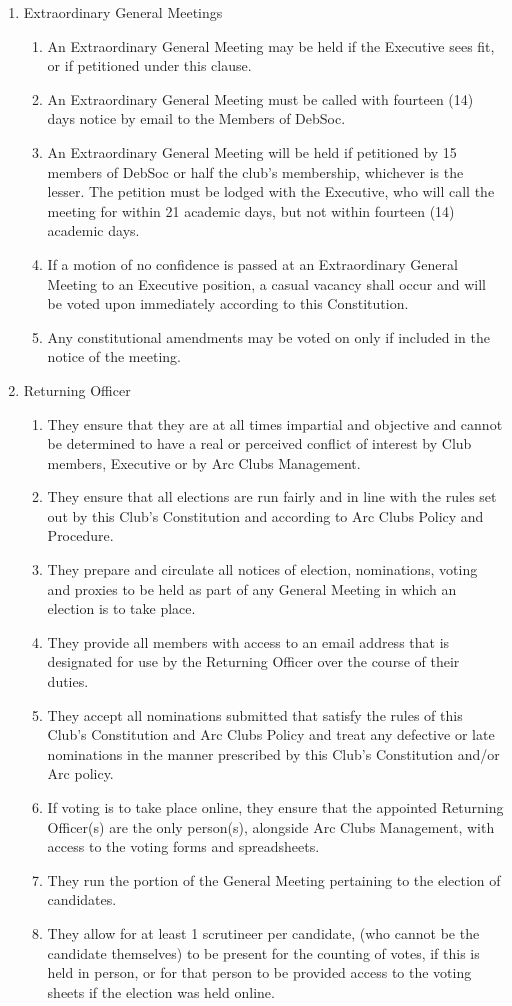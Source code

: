 \begin{enumerate}
\item Extraordinary General Meetings \label{egm_procedure}
  \begin{enumerate}
  \item An Extraordinary General Meeting may be held if the Executive sees fit, or if petitioned under this clause.
  \item An Extraordinary General Meeting must be called with fourteen (14) days notice by email to the Members of DebSoc.
  \item An Extraordinary General Meeting will be held if petitioned by 15 members of DebSoc or half the club's membership, whichever is the lesser. The petition must be lodged with the Executive, who will call the meeting for within 21 academic days, but not within fourteen (14) academic days.
  \item If a motion of no confidence is passed at an Extraordinary General Meeting to an Executive position, a casual vacancy shall occur and will be voted upon immediately according to this Constitution.
  \item Any constitutional amendments may be voted on only if included in the notice of the meeting.
  \end{enumerate}

\item Returning Officer
  \begin{enumerate}
  \item They ensure that they are at all times impartial and objective and cannot be determined to have a real or perceived conflict of interest by Club members, Executive or by Arc Clubs Management.
  \item They ensure that all elections are run fairly and in line with the rules set out by this Club’s Constitution and according to Arc Clubs Policy and Procedure.
  \item They prepare and circulate all notices of election, nominations, voting and proxies to be held as part of any General Meeting in which an election is to take place.
  \item They provide all members with access to an email address that is designated for use by the Returning Officer over the course of their duties.
  \item They accept all nominations submitted that satisfy the rules of this Club’s Constitution and Arc Clubs Policy and treat any defective or late nominations in the manner prescribed by this Club’s Constitution and/or Arc policy.
  \item If voting is to take place online, they ensure that the appointed Returning Officer(s) are the only person(s), alongside Arc Clubs Management, with access to the voting forms and spreadsheets.
  \item They run the portion of the General Meeting pertaining to the election of candidates.
  \item They allow for at least 1 scrutineer per candidate, (who cannot be the candidate themselves) to be present for the counting of votes, if this is held in person, or for that person to be provided access to the voting sheets if the election was held online.
  \end{enumerate}


\end{enumerate}

